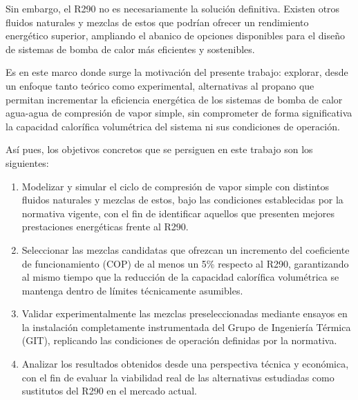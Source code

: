\documentclass[../main.tex]{subfiles}
\begin{document}
Sin embargo, el R290 no es necesariamente la solución definitiva. Existen otros fluidos naturales y mezclas de estos que podrían ofrecer un rendimiento energético superior, ampliando el abanico de opciones disponibles para el diseño de sistemas de bomba de calor más eficientes y sostenibles.

Es en este marco donde surge la motivación del presente trabajo: explorar, desde un enfoque tanto teórico como experimental, alternativas al propano que permitan incrementar la eficiencia energética de los sistemas de bomba de calor agua-agua de compresión de vapor simple, sin comprometer de forma significativa la capacidad calorífica volumétrica del sistema ni sus condiciones de operación.

Así pues, los objetivos concretos que se persiguen en este trabajo son los siguientes:

\begin{enumerate}
    \item Modelizar y simular el ciclo de compresión de vapor simple con distintos fluidos naturales y mezclas de estos, bajo las condiciones establecidas por la normativa vigente, con el fin de identificar aquellos que presenten mejores prestaciones energéticas frente al R290.

    \item Seleccionar las mezclas candidatas que ofrezcan un incremento del coeficiente de funcionamiento (COP) de al menos un 5\% respecto al R290, garantizando al mismo tiempo que la reducción de la capacidad calorífica volumétrica se mantenga dentro de límites técnicamente asumibles.

    \item Validar experimentalmente las mezclas preseleccionadas mediante ensayos en la instalación completamente instrumentada del Grupo de Ingeniería Térmica (GIT), replicando las condiciones de operación definidas por la normativa.

    \item Analizar los resultados obtenidos desde una perspectiva técnica y económica, con el fin de evaluar la viabilidad real de las alternativas estudiadas como sustitutos del R290 en el mercado actual.
\end{enumerate}



\newpage
\end{document}
